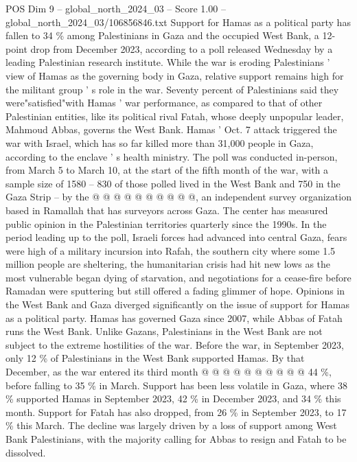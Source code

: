 \begin{textsample}{POS Dim 9 – global\_north\_2024\_03 – Score 1.00 – global\_north\_2024\_03/106856846.txt}  \label{ex:f9_pos_277}
Support for Hamas as a political party has fallen to 34 \% among Palestinians in Gaza and the occupied West Bank, a 12-point drop from December 2023, according to a poll released Wednesday by a leading Palestinian research institute.
While the war is eroding Palestinians ' view of Hamas as the governing body in Gaza, relative support remains high for the militant group ' s role in the war.
Seventy percent of Palestinians said they were"satisfied"with Hamas ' war performance, as compared to that of other Palestinian entities, like its political rival Fatah, whose deeply unpopular leader, Mahmoud Abbas, governs the West Bank.
Hamas ' Oct. 7 attack triggered the war with Israel, which has so far killed more than 31,000 people in Gaza, according to the enclave ' s health ministry.
The poll was conducted in-person, from March 5 to March 10, at the start of the fifth month of the war, with a sample size of 1580 -- 830 of those polled lived in the West Bank and 750 in the Gaza Strip -- by the @ @ @ @ @ @ @ @ @ @, an independent survey organization based in Ramallah that has surveyors across Gaza.
The center has measured public opinion in the Palestinian territories quarterly since the 1990s.
In the period leading up to the poll, Israeli forces had advanced into central Gaza, fears were high of a military incursion into Rafah, the southern city where some 1.5 million people are sheltering, the humanitarian crisis had hit new lows as the most vulnerable began dying of starvation, and negotiations for a cease-fire before Ramadan were sputtering but still offered a fading glimmer of hope.
Opinions in the West Bank and Gaza diverged significantly on the issue of support for Hamas as a political party.
Hamas has governed Gaza since 2007, while Abbas of Fatah runs the West Bank.
Unlike Gazans, Palestinians in the West Bank are not subject to the extreme hostilities of the war.
Before the war, in September 2023, only 12 \% of Palestinians in the West Bank supported Hamas.
By that December, as the war entered its third month @ @ @ @ @ @ @ @ @ @ 44 \%, before falling to 35 \% in March.
Support has been less volatile in Gaza, where 38 \% supported Hamas in September 2023, 42 \% in December 2023, and 34 \% this month.
Support for Fatah has also dropped, from 26 \% in September 2023, to 17 \% this March.
The decline was largely driven by a loss of support among West Bank Palestinians, with the majority calling for Abbas to resign and Fatah to be dissolved.

\end{textsample}

